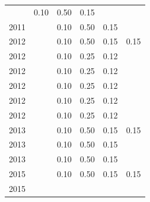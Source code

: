 \begin{table}[H]
\begin{tabular}{| l | c | c | c | c | c |}
          &
          0.10
          &
          0.50
          &
          0.15
          &
          \\
            2011
          &
          
          &
          0.10
          &
          0.50
          &
          0.15
          &
          \\
\hline
            2012
          &
          
          &
          0.10
          &
          0.50
          &
          0.15
          &
            {\color{red} 0.15}
          \\
            2012
          &
          
          &
          0.10
          &
          0.25
          &
          0.12
          &
          \\
            2012
          &
          
          &
          0.10
          &
          0.25
          &
          0.12
          &
          \\
            2012
          &
          
          &
          0.10
          &
          0.25
          &
          0.12
          &
          \\
            2012
          &
          
          &
          0.10
          &
          0.25
          &
          0.12
          &
          \\
            2012
          &
          
          &
          0.10
          &
          0.25
          &
          0.12
          &
          \\
\hline
            2013
          &
          
          &
          0.10
          &
          0.50
          &
          0.15
          &
            {\color{red} 0.15}
          \\
            2013
          &
          
          &
          0.10
          &
          0.50
          &
          0.15
          &
          \\
            2013
          &
          
          &
          0.10
          &
          0.50
          &
          0.15
          &
          \\
\hline
            2015
          &
          
          &
          0.10
          &
          0.50
          &
          0.15
          &
            {\color{red} 0.15}
          \\
            2015
          &
          

\end{tabular}
\end{table}
